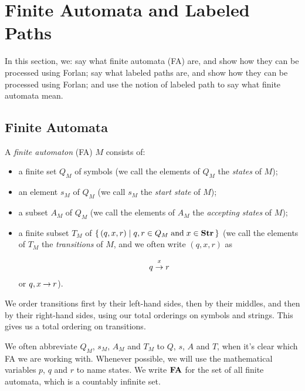 \section{Finite Automata and Labeled Paths}
\label{FiniteAutomataAndLabeledPaths}


In this section, we: say what finite automata (FA) are, and show how
they can be processed using Forlan; say what labeled paths are, and
show how they can be processed using Forlan; and use the notion of
labeled path to say what finite automata mean.

\subsection{Finite Automata}

A \emph{finite automaton} (FA) $M$ consists of:
\begin{itemize}
\item a finite set $Q_M$ of symbols (we call the elements of $Q_M$
the \emph{states} of $M$);

\item an element $s_M$ of $Q_M$ (we call $s_M$ the \emph{start state}
of $M$);

\item a subset $A_M$ of $Q_M$ (we call the elements of $A_M$ the
\emph{accepting states} of $M$);

\item a finite subset $T_M$ of $\{ \, (q,x,r) \mid q,r\in Q_M\;\allowbreak\mbox{and}\allowbreak\;
x\in\mathbf{Str} \, \}$ (we call the elements of $T_M$ the \emph{transitions} of
$M$, and we often write $(q, x, r)$ as
\begin{gather*}
q\stackrel{\strut x}{\rightarrow}r
\end{gather*}
or $q,x\mathbin{\to} r$).
\end{itemize}
%
%
%
%

We order transitions first by their left-hand sides, then by their
middles, and then by their right-hand sides, using our total orderings
on symbols and strings.  This gives us a total ordering on
transitions.

We often abbreviate $Q_M$, $s_M$, $A_M$ and $T_M$ to $Q$, $s$, $A$ and
$T$, when it's clear which FA we are working with.  Whenever possible,
we will use the mathematical variables $p$, $q$ and $r$ to name
states.  We write $\mathbf{FA}$ for the set of all finite automata, which is a
%
%
countably infinite set.


